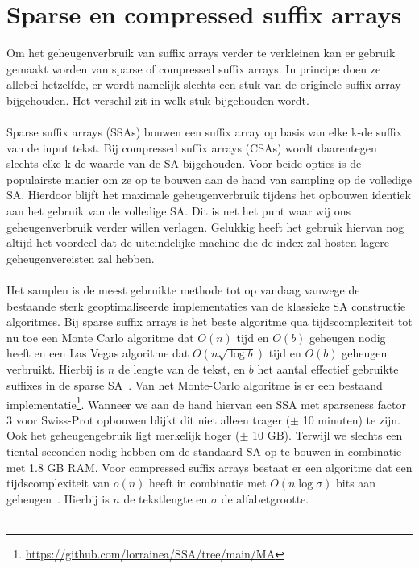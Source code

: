 \section{Sparse en compressed suffix arrays}\label{sec:sparse-en-compressed-suffix-arrays}
Om het geheugenverbruik van suffix arrays verder te verkleinen kan er gebruik gemaakt worden van sparse of compressed suffix arrays.
In principe doen ze allebei hetzelfde, er wordt namelijk slechts een stuk van de originele suffix array bijgehouden.
Het verschil zit in welk stuk bijgehouden wordt.
\\ \\
Sparse suffix arrays (SSAs) bouwen een suffix array op basis van elke k-de suffix van de input tekst.
Bij compressed suffix arrays (CSAs) wordt daarentegen slechts elke k-de waarde van de SA bijgehouden.
Voor beide opties is de populairste manier om ze op te bouwen aan de hand van sampling op de volledige SA\@.
Hierdoor blijft het maximale geheugenverbruik tijdens het opbouwen identiek aan het gebruik van de volledige SA\@.
Dit is net het punt waar wij ons geheugenverbruik verder willen verlagen.
Gelukkig heeft het gebruik hiervan nog altijd het voordeel dat de uiteindelijke machine die de index zal hosten lagere geheugenvereisten zal hebben.
\\ \\
Het samplen is de meest gebruikte methode tot op vandaag vanwege de bestaande sterk geoptimaliseerde implementaties van de klassieke SA constructie algoritmes.
Bij sparse suffix arrays is het beste algoritme qua tijdscomplexiteit tot nu toe een Monte Carlo algoritme dat $O(n)$ tijd en $O(b)$ geheugen nodig heeft en een Las Vegas algoritme dat $O(n \sqrt{\log b})$ tijd en $O(b)$ geheugen verbruikt.
Hierbij is $n$ de lengte van de tekst, en $b$ het aantal effectief gebruikte suffixes in de sparse SA~\cite{building_sparse_sa}.
Van het Monte-Carlo algoritme is er een bestaand implementatie\footnote{\url{https://github.com/lorrainea/SSA/tree/main/MA}}.
Wanneer we aan de hand hiervan een SSA met sparseness factor 3 voor Swiss-Prot opbouwen blijkt dit niet alleen trager ($\pm$ 10 minuten) te zijn.
Ook het geheugengebruik ligt merkelijk hoger ($\pm$ 10 GB).
Terwijl we slechts een tiental seconden nodig hebben om de standaard SA op te bouwen in combinatie met 1.8 GB RAM\@.
Voor compressed suffix arrays bestaat er een algoritme dat een tijdscomplexiteit van $o(n)$ heeft in combinatie met $O(n \log \sigma)$ bits aan geheugen~\cite{building_compressed_sa}.
Hierbij is $n$ de tekstlengte en $\sigma$ de alfabetgrootte.
\\ \\
